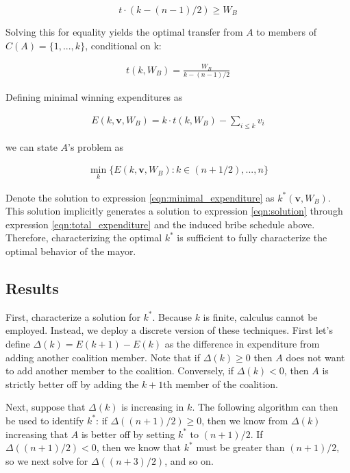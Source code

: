 $$t \cdot (k - (n - 1)/2) \geq W_B$$

Solving this for equality yields the optimal transfer from $A$ to members of $C(A) = \{1, ..., k\}$, conditional on k:

\begin{align}
    \label{eqn:common_transfer}
    t(k, W_B) = \frac{W_B}{k - (n - 1)/2}
\end{align}

Defining minimal winning expenditures as

\begin{align}
    \label{eqn:total_expenditure}
    E(k, \mathbf{v}, W_B) = k \cdot t(k, W_B) - \sum_{i \leq k} v_i
\end{align}

we can state $A$'s problem as

\begin{align}
\label{eqn:minimal_expenditure}
\min_k \{E(k, \mathbf{v}, W_B) : k \in {(n + 1/2), ..., n}\}
\end{align}

Denote the solution to expression \ref{eqn:minimal_expenditure} as $k^*(\mathbf{v}, W_B)$. This solution implicitly generates a solution to expression \ref{eqn:solution} through expression \ref{eqn:total_expenditure} and the induced bribe schedule above. Therefore, characterizing the optimal $k^*$ is sufficient to fully characterize the optimal behavior of the mayor.

\subsection*{Results}

First, characterize a solution for $k^*$. Because $k$ is finite, calculus cannot be employed. Instead, we deploy a discrete version of these techniques. First let's define $\Delta(k) = E(k + 1) - E(k)$ as the difference in expenditure from adding another coalition member. Note that if $\Delta(k) \geq 0$ then $A$ does not want to add another member to the coalition. Conversely, if $\Delta(k) < 0$, then $A$ is strictly better off by adding the $k + 1$th member of the coalition.

Next, suppose that $\Delta(k)$ is increasing in $k$. The following algorithm can then be used to identify $k^*$: if $\Delta((n + 1)/2) \geq 0$, then we know from $\Delta(k)$ increasing that $A$ is better off by setting $k^*$ to $(n + 1)/2$. If $\Delta((n + 1)/2) < 0$, then we know that $k^*$ must be greater than $(n + 1)/2$, so we next solve for $\Delta((n + 3)/2)$, and so on.

